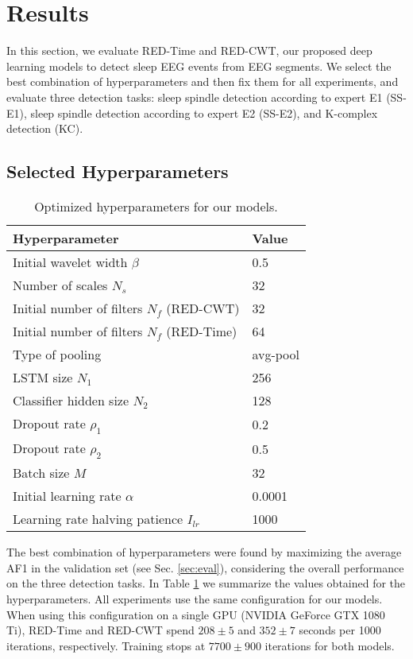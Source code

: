 \documentclass[conference]{IEEEtran}
\begin{document}
\section{Results}
In this section, we evaluate RED-Time and RED-CWT, our proposed deep learning models to detect sleep EEG events from EEG segments. We select the best combination of hyperparameters and then fix them for all experiments, and evaluate three detection tasks: sleep spindle detection according to expert E1 (SS-E1), sleep spindle detection according to expert E2 (SS-E2), and K-complex detection (KC).


\subsection{Selected Hyperparameters}
\label{sec:result_hyper}

\begin{table}[tbp]
\centering
\caption{Optimized hyperparameters for our models.}
\label{tab:hyper}
\begin{tabular}{ll}
    \toprule
    Hyperparameter  & Value \\
    \midrule
Initial wavelet width $\beta$ & 0.5\\
    Number of scales $N_s$ & 32\\
    Initial number of filters $N_f$ (RED-CWT) & 32\\
    Initial number of filters $N_f$ (RED-Time) & 64\\
    Type of pooling & avg-pool\\
    LSTM size $N_1$ & 256 \\
    Classifier hidden size $N_2$ & 128 \\
    Dropout rate $\rho_1$ & 0.2 \\
    Dropout rate $\rho_2$ & 0.5 \\
    Batch size $M$ & 32\\
    Initial learning rate $\alpha$ & 0.0001\\
    Learning rate halving patience $I_{lr}$ & 1000\\
\bottomrule
\end{tabular}
 \end{table}

The best combination of hyperparameters were found by maximizing the average AF1 in the validation set (see Sec. \ref{sec:eval}), considering the overall performance on the three detection tasks. In Table \ref{tab:hyper} we summarize the values obtained for the hyperparameters. All experiments use the same configuration for our models. When using this configuration on a single GPU (NVIDIA GeForce GTX 1080 Ti), RED-Time and RED-CWT spend $208\pm 5$ and $352\pm 7$ seconds per 1000 iterations, respectively. Training stops at $7700\pm 900$ iterations for both models.
\end{document}

